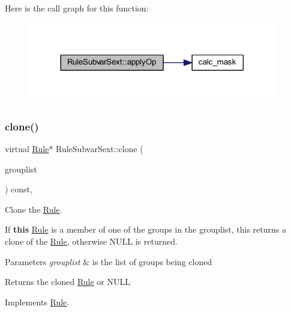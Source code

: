 Here is the call graph for this function\+:
\nopagebreak
\begin{figure}[H]
\begin{center}
\leavevmode
\includegraphics[width=308pt]{class_rule_subvar_sext_a77ff5f0a097fc96ad1a34fea4eae3821_cgraph}
\end{center}
\end{figure}
\mbox{\label{class_rule_subvar_sext_a8221b3db32eeca254df5da4825b7a527}} 
\subsubsection{\texorpdfstring{clone()}{clone()}}
{\footnotesize\ttfamily virtual \mbox{\hyperlink{class_rule}{Rule}}$\ast$ Rule\+Subvar\+Sext\+::clone (\begin{DoxyParamCaption}\item[{const \mbox{\hyperlink{class_action_group_list}{Action\+Group\+List}} \&}]{grouplist }\end{DoxyParamCaption}) const\hspace{0.3cm}{\ttfamily [inline]}, {\ttfamily [virtual]}}



Clone the \mbox{\hyperlink{class_rule}{Rule}}. 

If {\bfseries{this}} \mbox{\hyperlink{class_rule}{Rule}} is a member of one of the groups in the grouplist, this returns a clone of the \mbox{\hyperlink{class_rule}{Rule}}, otherwise N\+U\+LL is returned. 
\begin{DoxyParams}{Parameters}
{\em grouplist} & is the list of groups being cloned \\
\hline
\end{DoxyParams}
\begin{DoxyReturn}{Returns}
the cloned \mbox{\hyperlink{class_rule}{Rule}} or N\+U\+LL 
\end{DoxyReturn}


Implements \mbox{\hyperlink{class_rule_a70de90a76461bfa7ea0b575ce3c11e4d}{Rule}}.



